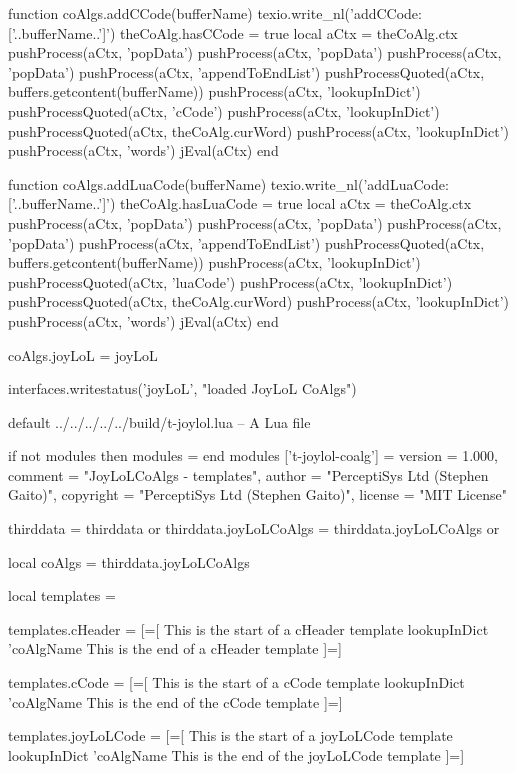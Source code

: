 function coAlgs.addCCode(bufferName)
  texio.write_nl('addCCode: ['..bufferName..']')
  theCoAlg.hasCCode = true
  local aCtx = theCoAlg.ctx
  pushProcess(aCtx, 'popData')
  pushProcess(aCtx, 'popData')
  pushProcess(aCtx, 'popData')
  pushProcess(aCtx, 'appendToEndList')
  pushProcessQuoted(aCtx, buffers.getcontent(bufferName))
  pushProcess(aCtx, 'lookupInDict')
  pushProcessQuoted(aCtx, 'cCode')
  pushProcess(aCtx, 'lookupInDict')
  pushProcessQuoted(aCtx, theCoAlg.curWord)
  pushProcess(aCtx, 'lookupInDict')
  pushProcess(aCtx, 'words')
  jEval(aCtx)
end

function coAlgs.addLuaCode(bufferName)
  texio.write_nl('addLuaCode: ['..bufferName..']')
  theCoAlg.hasLuaCode = true
  local aCtx = theCoAlg.ctx
  pushProcess(aCtx, 'popData')
  pushProcess(aCtx, 'popData')
  pushProcess(aCtx, 'popData')
  pushProcess(aCtx, 'appendToEndList')
  pushProcessQuoted(aCtx, buffers.getcontent(bufferName))
  pushProcess(aCtx, 'lookupInDict')
  pushProcessQuoted(aCtx, 'luaCode')
  pushProcess(aCtx, 'lookupInDict')
  pushProcessQuoted(aCtx, theCoAlg.curWord)
  pushProcess(aCtx, 'lookupInDict')
  pushProcess(aCtx, 'words')
  jEval(aCtx)
end

coAlgs.joyLoL = joyLoL

interfaces.writestatus('joyLoL', "loaded JoyLoL CoAlgs")
\stopLuaCode

\createLuaCodeFile%
  {default}%
  {../../../../../build/t-joylol.lua}%
  {-- A Lua file}

\startLuaTemplate
if not modules then modules = { } end modules ['t-joylol-coalg'] = {
    version   = 1.000,
    comment   = "JoyLoLCoAlgs - templates",
    author    = "PerceptiSys Ltd (Stephen Gaito)",
    copyright = "PerceptiSys Ltd (Stephen Gaito)",
    license   = "MIT License"
}

thirddata              = thirddata              or {}
thirddata.joyLoLCoAlgs = thirddata.joyLoLCoAlgs or {}

local coAlgs     = thirddata.joyLoLCoAlgs

local templates  = { }

templates.cHeader = [=[
This is the start of a cHeader template
{{ lookupInDict 'coAlgName }}
This is the end of a cHeader template
]=]

templates.cCode = [=[
This is the start of a cCode template
{{ lookupInDict 'coAlgName }}
This is the end of the cCode template
]=]

templates.joyLoLCode = [=[
This is the start of a joyLoLCode template
{{ lookupInDict 'coAlgName }}
This is the end of the joyLoLCode template
]=]


